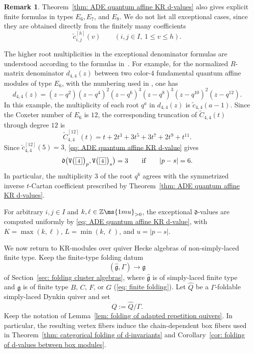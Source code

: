 \documentclass[12pt, leqno]{amsart}
\numberwithin{equation}{section}
\theoremstyle{plain}
\theoremstyle{definition}
\newtheorem{remark}[lemma]{Remark}
\newcommand{\Vkm}[1]{%
  \ttV\bigl(\hspace{0.2ex}\scalebox{.8}{\(\boxed{#1}\)}\hspace{0.2ex}\bigr)%
}
\newcommand{\seteq}{\mathbin{:=}}
\newcommand{\g}{\mathfrak{g}}
\newcommand{\Z}{\mathbb{Z}\ms{1mu}}
\newcommand{\de}{\mathfrak{d}}
\newcommand{\tC}{\widetilde{C}}
\newcommand{\tc}{\widetilde{c}}
\newcommand{\hQ}{\widehat{Q}}
\newcommand{\hg}{{\widehat{\g}}}
\newcommand{\ttV}{\mathtt{V}}
\begin{document}
 \begin{remark}\label{rem: exceptional KR d-values}
Theorem~\ref{thm: ADE quantum affine KR d-values} also gives
explicit finite formulas in types \(E_6,E_7\), and \(E_8\).
We do not list all exceptional cases, since they are obtained
directly from the finitely many coefficients  
\[
\tc_{i,j}^{[h]}(v)
\qquad
(i,j\in I,\ 1\leq v\leq h).
\]

The higher root multiplicities in the exceptional denominator
formulas are understood according to the formulas in~\cite{OhSc19,OS19c}.  For example, for the normalized \(R\)-matrix denominator
\(d_{4,4}(z)\) between two color-\(4\) fundamental quantum affine
modules of type \(E_6\), with the numbering used in \cite[Proposition~2.1]{OS19c}, one has
\[
d_{4,4}(z)
=
(z-q^2)(z-q^4)^2(z-q^6)^3
(z-q^8)^3(z-q^{10})^2(z-q^{12}).
\]
In this example, the multiplicity of each root \(q^a\) in
\(d_{4,4}(z)\) is \(\tc_{4,4}(a-1)\).
Since the Coxeter number of \(E_6\) is \(12\), the corresponding
truncation of \(\tC_{4,4}(t)\) through degree \(12\) is  
\[
\tC_{4,4}^{[12]}(t)
=
t+2t^3+3t^5+3t^7+2t^9+t^{11}.
\]
Since \(\tc_{4,4}^{[12]}(5)=3\),
\eqref{eq: ADE quantum affine KR d-value} gives
\[
\de\bigl(\Vkm{4}_p, \Vkm{4}_s \bigr) = 3 \qquad\text{if}\qquad  |p-s|=6.
\]
In particular, the multiplicity \(3\) of the root \(q^6\) agrees
with the symmetrized inverse \(t\)-Cartan coefficient prescribed by
Theorem~\ref{thm: ADE quantum affine KR d-values}.

For arbitrary \(i,j\in I\) and \(k,\ell\in\Z_{>0}\), the exceptional
\(\de\)-values are computed uniformly by
\eqref{eq: ADE quantum affine KR d-value}, with
\(K=\max(k,\ell)\), \(L=\min(k,\ell)\), and \(u=|p-s|\).
\end{remark}

We now return to KR-modules over quiver Hecke algebras of non-simply-laced finite
type.  Keep the finite-type folding datum
\[
(\hg,\Gamma)\longrightarrow\g
\]
of Section~\ref{sec: folding cluster algebras}, where \(\hg\) is of
simply-laced finite type and \(\g\) is of finite type \(B\), \(C\), \(F\), or
\(G\) (\eqref{eq: finite folding}).  Let \(\hQ\) be a \(\Gamma\)-foldable simply-laced Dynkin quiver 
and set
\[
Q\seteq\hQ/\Gamma.
\]
Keep the notation of
Lemma~\ref{lem: folding of adapted repetition quivers}.  In
particular, the resulting vertex fibers induce the chain-dependent
box fibers used in
Theorem~\ref{thm: categorical folding of d-invariants} and
Corollary~\ref{cor: folding of d-values between box modules}.
\end{document}
